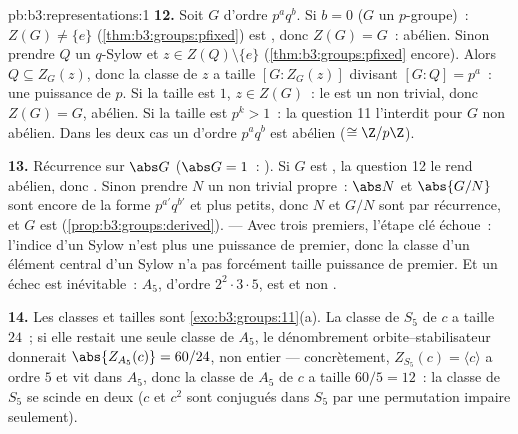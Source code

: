\begin{solution}{pb:b3:representations:1}
\textbf{12.} Soit $G$  d'ordre $p^aq^b$. Si $b = 0$ ($G$
un $p$-groupe)~: $Z(G) \neq \{e\}$
(\cref{thm:b3:groups:pfixed}) est , donc $Z(G) = G$~:
abélien. Sinon prendre $Q$ un $q$-Sylow et $z \in Z(Q)
\setminus\{e\}$ (\cref{thm:b3:groups:pfixed} encore). Alors $Q
\subseteq Z_G(z)$, donc la classe de $z$ a taille $[G :
Z_G(z)]$ divisant $[G : Q] = p^a$~: une puissance de $p$. Si la
taille est $1$, $z \in Z(G)$~: le  est un  non trivial, donc $Z(G) = G$, abélien. Si la taille est
$p^k > 1$~: la question 11 l'interdit pour $G$  non
abélien. Dans les deux cas un  d'ordre $p^aq^b$
est abélien ($\cong \Z/p\Z$).

\textbf{13.} Récurrence sur $\abs G$ ($\abs G = 1$~: ).
Si $G$ est , la question 12 le rend abélien, donc
. Sinon prendre $N$ un  non trivial
propre~: $\abs N$ et $\abs{G/N}$ sont encore de la forme
$p^{a'}q^{b'}$ et plus petits, donc $N$ et $G/N$ sont
 par récurrence, et $G$ est 
(\cref{prop:b3:groups:derived}). --- Avec trois premiers,
l'étape clé échoue~: l'indice d'un Sylow n'est plus une
puissance de premier, donc la classe d'un élément central d'un
Sylow n'a pas forcément taille puissance de premier. Et un
échec est inévitable~: $A_5$, d'ordre $2^2\cdot3\cdot5$, est
 et non .

\textbf{14.} Les classes et tailles sont
\cref{exo:b3:groups:11}(a). La classe de $S_5$ de $c$ a taille
$24$~; si elle restait une seule classe de $A_5$, le
dénombrement orbite--stabilisateur donnerait $\abs{Z_{A_5}(c)}
= 60/24$, non entier --- concrètement, $Z_{S_5}(c) = \langle
c\rangle$ a ordre $5$ et vit dans $A_5$, donc la classe de
$A_5$ de $c$ a taille $60/5 = 12$~: la classe de $S_5$ se
scinde en deux ($c$ et $c^2$ sont conjugués dans $S_5$ par une
permutation impaire seulement).


\end{solution}
